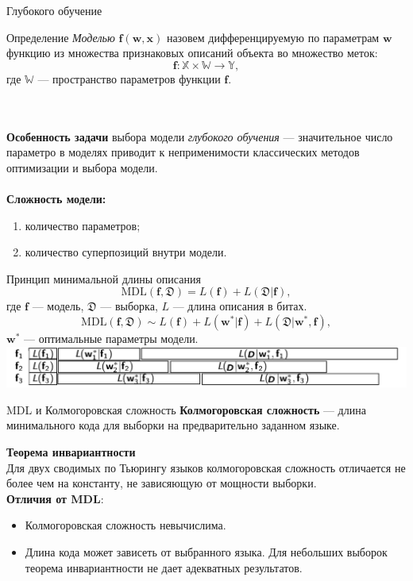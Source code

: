 \documentclass[usenames,dvipsnames,10pt,pdf,utf8,russian,aspectratio=43]{beamer}
\begin{document}
\begin{frame}{Глубокого обучение}
\begin{block}{Определение}
\textit{Моделью} $\mathbf{f}(\mathbf{w}, \mathbf{x})$ назовем дифференцируемую по параметрам $\mathbf{w}$ функцию из множества признаковых описаний объекта во множество меток:
\[
    \mathbf{f}: \mathbb{X} \times \mathbb{W} \to \mathbb{Y},
\] 
где $\mathbb{W}$ --- пространство параметров функции $\mathbf{f}$.
\end{block}
~\\~\\
\textbf{Особенность задачи}  выбора модели \textit{глубокого обучения} --- значительное число параметро в моделях приводит к неприменимости классических методов оптимизации и выбора модели. \\~\\

\textbf{Сложность модели:}
\begin{enumerate}
\item количество параметров;
\item количество суперпозиций внутри модели.
\end{enumerate}
\end{frame}


\begin{frame}{Принцип минимальной длины описания}
\[
\text{MDL}(\mathbf{f}, \mathfrak{D}) = L(\mathbf{f}) + L(\mathfrak{D}|\mathbf{f}),
\]
где $\mathbf{f}$ --- модель, $\mathfrak{D}$ --- выборка, $L$ --- длина описания в битах.
\\
\[
\text{MDL}(\mathbf{f}, \mathfrak{D}) \sim L(\mathbf{f}) + L(\mathbf{w}^*| \mathbf{f}) + L(\mathfrak{D}|\mathbf{w}^*, \mathbf{f}),
\]
$\mathbf{w}^*$ --- оптимальные параметры модели.\\

\includegraphics[width=\textwidth]{./mdl.png}

\end{frame}

\begin{frame}{MDL и Колмогоровская сложность}
\textbf{Колмогоровская сложность} --- длина минимального кода для выборки на предварительно заданном языке.

\textbf{Теорема инвариантности}\\
Для двух сводимых по Тьюрингу языков колмогоровская сложность  отличается не более чем на константу, не зависяющую от мощности выборки.\\

\textbf{Отличия от MDL}:
\begin{itemize}
\item Колмогоровская сложность невычислима.
\item Длина кода может зависеть от выбранного языка. Для небольших выборок теорема инвариантности не дает адекватных результатов.
\end{itemize}
\end{frame}
\end{document}
